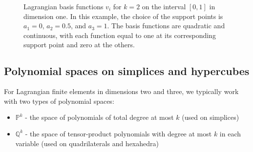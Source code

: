 \begin{figure}[!htb]
\centering
{}
\caption{Lagrangian basis functions $v_i$ for $k=2$ on the interval $[0,1]$ in dimension one. In this example, the choice of the support points is $a_1=0$, $a_2=0.5$, and $a_3=1$. The basis functions are quadratic and continuous, with each function equal to one at its corresponding support point and zero at the others.}
\label{fig:lagrange_basis}
\end{figure}

\subsection{Polynomial spaces on simplices and hypercubes}

For Lagrangian finite elements in dimensions two and three, we typically work with two types of polynomial spaces:

\begin{itemize}
\item $\mathbb{P}^k$ - the space of polynomials of total degree at most $k$ (used on simplices)
\item $\mathbb{Q}^k$ - the space of tensor-product polynomials with degree at most $k$ in each variable (used on quadrilaterals and hexahedra)
\end{itemize}

